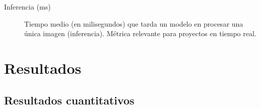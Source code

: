 \documentclass[12pt,a4paper,onecolumn,oneside]{report}
\begin{document}
\begin{description}
  \item[Inferencia (ms)] Tiempo medio (en milisegundos) que tarda un modelo en procesar una única imagen (inferencia). Métrica relevante para proyectos en tiempo real.

\end{description}


\chapter{Resultados} %
\label{Resultados}

\section{Resultados cuantitativos}
\label{sec:Resultados cuantitativos}

\begin{table}[H]
  \caption{Resultados de los modelos en la prueba de concepto inicial}
  \centering
  \label{tab:yolov7_results}
\end{table}
\end{document}

